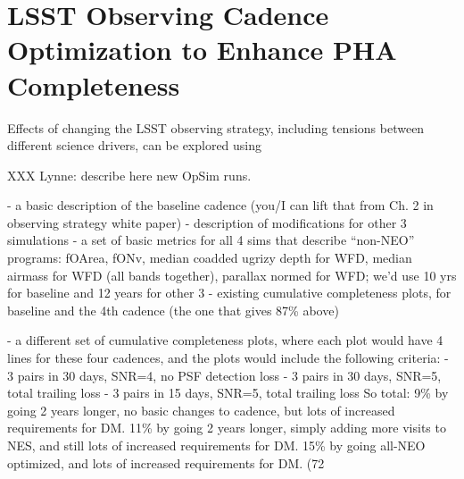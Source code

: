 
\section{LSST Observing Cadence Optimization to Enhance PHA Completeness}


Effects of changing the LSST observing strategy, including tensions between different science drivers, can be explored using 


XXX Lynne: describe here new OpSim runs.  

- a basic description of the baseline cadence (you/I can lift that from 
  Ch. 2 in observing strategy white paper) 
- description of modifications for other 3 simulations 
- a set of basic metrics for all 4 sims that describe “non-NEO” programs: 
   fOArea, fONv, median coadded ugrizy depth for WFD, median airmass 
   for WFD (all bands together), parallax normed for WFD; we’d use 10 yrs
   for baseline and 12 years for other 3 
- existing cumulative completeness plots, for baseline and the 4th cadence
   (the one that gives 87\% above)
        
- a different set of cumulative completeness plots, where each plot would 
   have 4 lines for these four cadences, and the plots would include the
   following criteria:
       - 3 pairs in 30 days, SNR=4, no PSF detection loss
       - 3 pairs in 30 days, SNR=5, total trailing loss
       - 3 pairs in 15 days, SNR=5, total trailing loss
So total: 
9\% by going 2 years longer, no basic changes to cadence, but lots of increased requirements for DM. 
11\% by going 2 years longer, simply adding more visits to NES, and still lots of increased requirements for DM. 
15\% by going all-NEO optimized, and lots of increased requirements for DM. (72%





